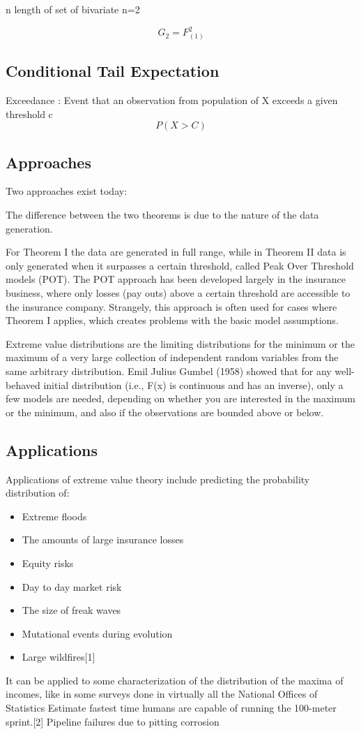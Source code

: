 n length of set of bivariate n=2

\[ G_2 = F_{(1)}^2 \]



\subsection*{Conditional Tail Expectation}

Exceedance : Event that an observation from population of X exceeds a given threshold c
\[ P (X > C) \]



\subsection*{Approaches}

Two approaches exist today:

The difference between the two theorems is due to the nature of the data generation. 

For Theorem I the data are generated in full range, while in Theorem II data is only generated when it surpasses a certain threshold, called Peak Over Threshold models (POT). The POT approach has been developed largely in the insurance business, where only losses (pay outs) above a certain threshold are accessible to the insurance company. Strangely, this approach is often used for cases where Theorem I applies, which creates problems with the basic model assumptions.

Extreme value distributions are the limiting distributions for the minimum or the maximum of a very large collection of independent random variables from the same arbitrary distribution. Emil Julius Gumbel (1958) showed that for any well-behaved initial distribution (i.e., F(x) is continuous and has an inverse), only a few models are needed, depending on whether you are interested in the maximum or the minimum, and also if the observations are bounded above or below.

\subsection*{Applications}

Applications of extreme value theory include predicting the probability distribution of:
\begin{itemize}
\item Extreme floods
\item The amounts of large insurance losses
\item Equity risks
\item Day to day market risk
\item The size of freak waves
\item Mutational events during evolution
\item Large wildfires[1]
\end{itemize}
It can be applied to some characterization of the distribution of the maxima of incomes, like in some surveys done in virtually all the National Offices of Statistics
Estimate fastest time humans are capable of running the 100-meter sprint.[2]
Pipeline failures due to pitting corrosion
